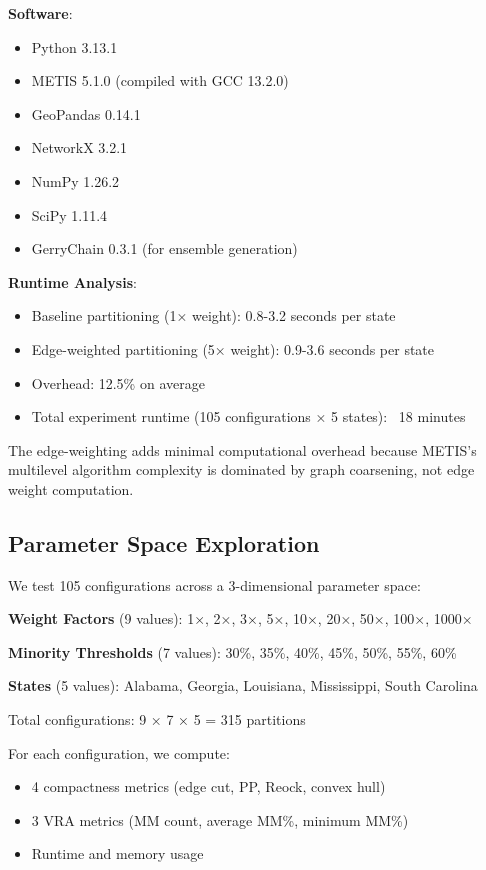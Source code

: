 {\textbf{Software}:
\begin{itemize}
    \item Python 3.13.1
    \item METIS 5.1.0 (compiled with GCC 13.2.0)
    \item GeoPandas 0.14.1
    \item NetworkX 3.2.1
    \item NumPy 1.26.2
    \item SciPy 1.11.4
    \item GerryChain 0.3.1 (for ensemble generation)
\end{itemize}

\textbf{Runtime Analysis}:
\begin{itemize}
    \item Baseline partitioning (1× weight): 0.8-3.2 seconds per state
    \item Edge-weighted partitioning (5× weight): 0.9-3.6 seconds per state
    \item Overhead: 12.5\% on average
    \item Total experiment runtime (105 configurations × 5 states): ~18 minutes
\end{itemize}

The edge-weighting adds minimal computational overhead because METIS's multilevel algorithm complexity is dominated by graph coarsening, not edge weight computation.

\subsection{Parameter Space Exploration}

We test 105 configurations across a 3-dimensional parameter space:

\textbf{Weight Factors} (9 values): 1×, 2×, 3×, 5×, 10×, 20×, 50×, 100×, 1000×

\textbf{Minority Thresholds} (7 values): 30\%, 35\%, 40\%, 45\%, 50\%, 55\%, 60\%

\textbf{States} (5 values): Alabama, Georgia, Louisiana, Mississippi, South Carolina

Total configurations: 9 × 7 × 5 = 315 partitions

For each configuration, we compute:
\begin{itemize}
    \item 4 compactness metrics (edge cut, PP, Reock, convex hull)
    \item 3 VRA metrics (MM count, average MM\%, minimum MM\%)
    \item Runtime and memory usage
\end{itemize}

}
